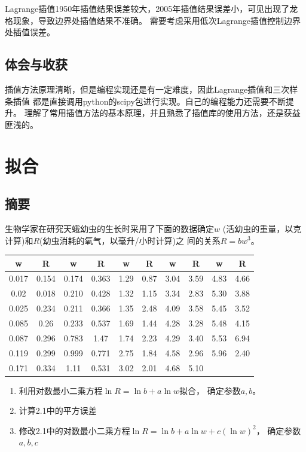 \documentclass{article}
\begin{document}
Lagrange插值1950年插值结果误差较大，2005年插值结果误差小，可见出现了龙格现象，导致边界处插值结果不准确。
需要考虑采用低次Lagrange插值控制边界处插值误差。

\subsection{体会与收获}
插值方法原理清晰，但是编程实现还是有一定难度，因此Lagrange插值和三次样条插值
都是直接调用python的scipy包进行实现。自己的编程能力还需要不断提升。
理解了常用插值方法的基本原理，并且熟悉了插值库的使用方法，还是获益匪浅的。

\newpage
\section{拟合}
\subsection{摘要}
生物学家在研究天蛾幼虫的生长时采用了下面的数据确定$w$
(活幼虫的重量，以克计算)和$R$(幼虫消耗的氧气，以毫升/小时计算)之
间的关系$R=bw^3$。
\begin{table}[!ht]
    \centering
    \begin{tabular}{|c|c|c|c|c|c|c|c|c|c|}
    \hline
        w & R & w & R & w & R & w & R & w & R \\ \hline
        0.017 & 0.154 & 0.174 & 0.363 & 1.29 & 0.87 & 3.04 & 3.59 & 4.83 & 4.66 \\ \hline
        0.02 & 0.018 & 0.210  & 0.428 & 1.32 & 1.15 & 3.34 & 2.83 & 5.30  & 3.88 \\ \hline
        0.025 & 0.234 & 0.211 & 0.366 & 1.35 & 2.48 & 4.09 & 3.58 & 5.45 & 3.52 \\ \hline
        0.085 & 0.26 & 0.233 & 0.537 & 1.69 & 1.44 & 4.28 & 3.28 & 5.48 & 4.15 \\ \hline
        0.087 & 0.296 & 0.783 & 1.47 & 1.74 & 2.23 & 4.29 & 3.40  & 5.53 & 6.94 \\ \hline
        0.119 & 0.299 & 0.999 & 0.771 & 2.75 & 1.84 & 4.58 & 2.96 & 5.96 & 2.40  \\ \hline
        0.171 & 0.334 & 1.11 & 0.531 & 3.02 & 2.01 & 4.68 & 5.10 & & \\ \hline
    \end{tabular}
\end{table}
\begin{enumerate}
    \item 利用对数最小二乘方程\texorpdfstring{$\ln R=\ln b+a\ln w$}{}拟合，
        确定参数\texorpdfstring{$a,b$}{}。
    \item 计算2.1中的平方误差
    \item 修改2.1中的对数最小二乘方程\texorpdfstring{$\ln R=\ln b+a\ln w+c(\ln w)^2$}{}，
        确定参数\texorpdfstring{$a,b,c$}{} 
\end{enumerate}
\end{document}
